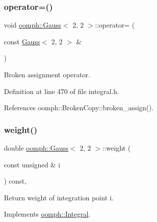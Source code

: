 \mbox{\label{classoomph_1_1Gauss_3_012_00_012_01_4_a92a0fcc315e22787911d26cfab4a2337}} 
\subsubsection{\texorpdfstring{operator=()}{operator=()}}
{\footnotesize\ttfamily void \hyperlink{classoomph_1_1Gauss}{oomph\+::\+Gauss}$<$ 2, 2 $>$\+::operator= (\begin{DoxyParamCaption}\item[{const \hyperlink{classoomph_1_1Gauss}{Gauss}$<$ 2, 2 $>$ \&}]{ }\end{DoxyParamCaption})\hspace{0.3cm}{\ttfamily [inline]}}



Broken assignment operator. 



Definition at line 470 of file integral.\+h.



References oomph\+::\+Broken\+Copy\+::broken\+\_\+assign().

\mbox{\label{classoomph_1_1Gauss_3_012_00_012_01_4_a11810c440d7ffbd7e61f0d002e65b507}} 
\subsubsection{\texorpdfstring{weight()}{weight()}}
{\footnotesize\ttfamily double \hyperlink{classoomph_1_1Gauss}{oomph\+::\+Gauss}$<$ 2, 2 $>$\+::weight (\begin{DoxyParamCaption}\item[{const unsigned \&}]{i }\end{DoxyParamCaption}) const\hspace{0.3cm}{\ttfamily [inline]}, {\ttfamily [virtual]}}



Return weight of integration point i. 



Implements \hyperlink{classoomph_1_1Integral_ac65335e2aab120b285b3d6c294507b06}{oomph\+::\+Integral}.



